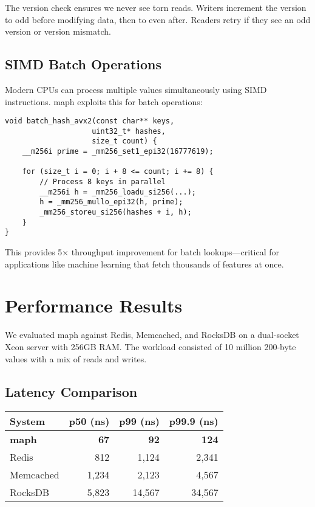 \documentclass[11pt]{article}
\begin{document}
The version check ensures we never see torn reads. Writers increment the version to odd before modifying data, then to even after. Readers retry if they see an odd version or version mismatch.

\subsection{SIMD Batch Operations}

Modern CPUs can process multiple values simultaneously using SIMD instructions. maph exploits this for batch operations:

\begin{lstlisting}
void batch_hash_avx2(const char** keys, 
                    uint32_t* hashes,
                    size_t count) {
    __m256i prime = _mm256_set1_epi32(16777619);
    
    for (size_t i = 0; i + 8 <= count; i += 8) {
        // Process 8 keys in parallel
        __m256i h = _mm256_loadu_si256(...);
        h = _mm256_mullo_epi32(h, prime);
        _mm256_storeu_si256(hashes + i, h);
    }
}
\end{lstlisting}

This provides 5× throughput improvement for batch lookups—critical for applications like machine learning that fetch thousands of features at once.

\section{Performance Results}

We evaluated maph against Redis, Memcached, and RocksDB on a dual-socket Xeon server with 256GB RAM. The workload consisted of 10 million 200-byte values with a mix of reads and writes.

\subsection{Latency Comparison}

\begin{center}
\begin{tabular}{lrrr}
\toprule
System & p50 (ns) & p99 (ns) & p99.9 (ns) \\
\midrule
\textbf{maph} & \textbf{67} & \textbf{92} & \textbf{124} \\
Redis & 812 & 1,124 & 2,341 \\
Memcached & 1,234 & 2,123 & 4,567 \\
RocksDB & 5,823 & 14,567 & 34,567 \\
\bottomrule
\end{tabular}
\end{center}
\end{document}
